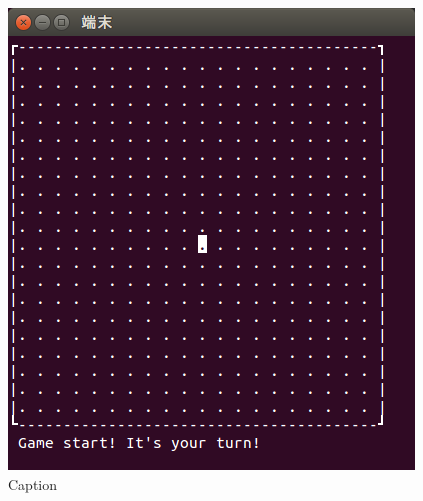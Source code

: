 \documentclass[a4j, titlepage, 10pt]{jsarticle}
\begin{document}
\begin{figure}[H]
\begin{minipage}{0.5\hsize}
    \includegraphics[scale=0.5]{img/game-start2.png}
    \caption{Caption}
    \label{fig:game-start2.png}
  \end{minipage}
\end{figure}
\end{document}
